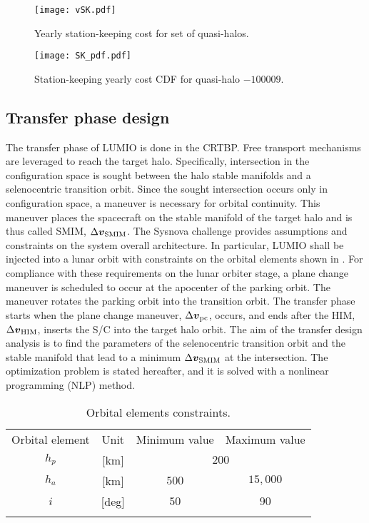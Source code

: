 %
%
\begin{figure}[]
	\centering
	\texttt{[image: vSK.pdf]}
	\caption{Yearly station-keeping cost for set of quasi-halos.}
	\label{fig:YearlySKcost}
\end{figure}
%
%
\begin{figure}[t]
	\centering
	\texttt{[image: SK\_pdf.pdf]}
	\caption{Station-keeping yearly cost CDF for quasi-halo $-100009$.}
	\label{fig:Halo9distribution}
\end{figure}
%


\subsection{Transfer phase design}\label{subsec:Transfer phase design}
The transfer phase of LUMIO is done in the CRTBP. Free transport mechanisms are leveraged to reach the target halo. Specifically, intersection in the configuration space is sought between the halo stable manifolds and a selenocentric transition orbit. Since the sought intersection occurs only in configuration space, a maneuver is necessary for orbital continuity. This maneuver places the spacecraft on the stable manifold of the target halo and is thus called {SMIM}, $\Delta\boldsymbol{v}_{\textrm{SMIM}}$. The Sysnova challenge provides assumptions and constraints on the system overall architecture. In particular, LUMIO shall be injected into a lunar orbit with constraints on the orbital elements shown in . For compliance with these requirements on the lunar orbiter stage, a plane change maneuver is scheduled to occur at the apocenter of the parking orbit. The maneuver rotates the parking orbit into the transition orbit. The transfer phase starts when the plane change maneuver, $\Delta\boldsymbol{v}_{\textrm{pc}}$, occurs, and ends after the {HIM}, $\Delta\boldsymbol{v}_{\textrm{HIM}}$, inserts the {S/C} into the target halo orbit. The aim of the transfer design analysis is to find the parameters of the selenocentric transition orbit and the stable manifold that lead to a minimum $\Delta\boldsymbol{v}_{\textrm{SMIM}}$ at the intersection. The optimization problem is stated hereafter, and it is solved with a nonlinear programming (NLP) method.
%
\begin{table}[b!]
	\caption{Orbital elements constraints.}
	\label{tab:OrbitalElementsConstraints}
	\centering
	\footnotesize
	\begin{tabular}{cccc}
		\TOPlines
		Orbital element & Unit & Minimum value & Maximum value \\
		\MIDline
		$h_p$ & [km] & \multicolumn{2}{c}{$200$} \\
		$h_a$ & [km] & $500$ & $15,000$ \\
		$i$ & [deg] & $50$ & $90$ \\
		\BOTTOMlines
	\end{tabular}
\end{table}
%

